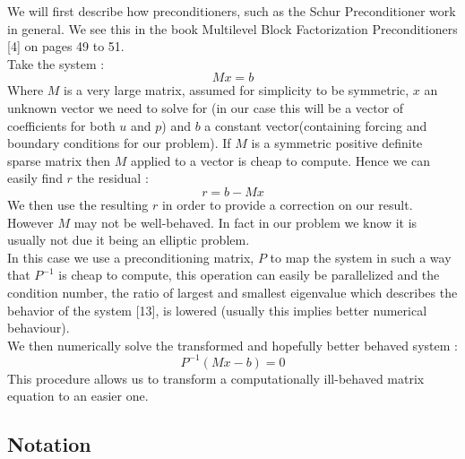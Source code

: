 \documentclass[11pt,twoside,a4paper]{article}
\begin{document}
We will first describe how preconditioners, such as the Schur Preconditioner work in general. We see this in the book Multilevel Block Factorization Preconditioners [4] on pages 49 to 51.\\
Take the system :\\
$$
Mx = b
$$
Where $M$ is a very large matrix, assumed for simplicity to be symmetric, $x$ an unknown vector we need to solve for (in our case this will be a vector of coefficients for both $u$ and $p$) and $b$ a constant vector(containing forcing and boundary conditions for our problem). If $M$ is a symmetric positive definite sparse matrix then $M$ applied to a vector is cheap to compute. Hence we can easily find $r$ the residual :\\
$$
r = b - Mx
$$
We then use the resulting $r$ in order to provide a correction on our result.\\
However $M$ may not be well-behaved. In fact in our problem we know it is usually not due it being an elliptic problem.\\
In this case we use a preconditioning matrix, $P$ to map the system in such a way that $P^{-1}$ is cheap to compute, this operation can easily be parallelized and the condition number, the ratio of largest and smallest eigenvalue which describes the behavior of the system [13], is lowered (usually this implies better numerical behaviour).\\
We then numerically solve the transformed and hopefully better behaved system :
$$
P^{-1}(Mx-b) = 0
$$
This procedure allows us to transform a computationally ill-behaved matrix equation to an easier one.

\subsection{Notation}
\end{document}
